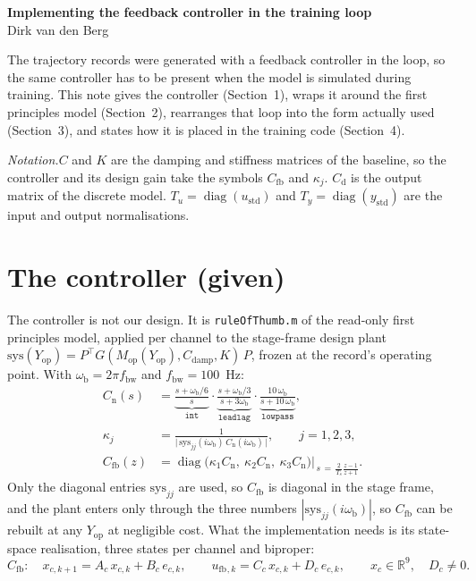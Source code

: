 \documentclass[11pt]{article}
\newcommand{\R}{\mathbb{R}}
\newcommand{\diag}{\operatorname{diag}}
\newcommand{\Cfb}{C_{\mathrm{fb}}}
\newcommand{\Cnorm}{C_{\mathrm{n}}}
\newcommand{\wb}{\omega_{\mathrm{b}}}
\newcommand{\ufb}{u_{\mathrm{fb}}}
\newcommand{\Yop}{Y_{\mathrm{op}}}
\newcommand{\Tu}{T_{u}}
\newcommand{\Ty}{T_{y}}
\begin{document}
\begin{center}
  {\Large\bfseries Implementing the feedback controller in the training loop}\\[0.3em]
  {\normalsize Dirk van den Berg}
\end{center}
\vspace{0.3em}

\noindent The trajectory records were generated with a feedback controller in the loop, so the
same controller has to be present when the model is simulated during training. This note gives
the controller (Section~1), wraps it around the first principles model (Section~2), rearranges
that loop into the form actually used (Section~3), and states how it is placed in the training
code (Section~4).

\medskip\noindent\emph{Notation.}\quad $C$ and $K$ are the damping and stiffness matrices of the
baseline, so the controller and its design gain take the symbols $\Cfb$ and $\kappa_j$.
$C_{\mathrm{d}}$ is the output matrix of the discrete model. $\Tu = \diag(u_{\mathrm{std}})$ and
$\Ty = \diag(y_{\mathrm{std}})$ are the input and output normalisations.

\section{The controller (given)}

The controller is not our design. It is \texttt{ruleOfThumb.m} of the read-only first principles
model, applied per channel to the stage-frame design plant
$\mathrm{sys}(\Yop) = P^{\top} G(M_{\mathrm{op}}(\Yop), C_{\mathrm{damp}}, K)\, P$, frozen at the
record's operating point. With $\wb = 2\pi f_{\mathrm{bw}}$ and $f_{\mathrm{bw}} = 100$~Hz:
\begin{align}
  \Cnorm(s) &=
  \underbrace{\frac{s + \wb/6}{s}}_{\texttt{int}} \cdot
  \underbrace{\frac{s + \wb/3}{s + 3\wb}}_{\texttt{leadlag}} \cdot
  \underbrace{\frac{10\,\wb}{s + 10\,\wb}}_{\texttt{lowpass}} ,
  \label{eq:cnorm}\\[1mm]
  \kappa_j &= \frac{1}{\bigl|\,\mathrm{sys}_{jj}(i\wb)\,\Cnorm(i\wb)\,\bigr|} ,
  \qquad j = 1,2,3 ,
  \label{eq:kappa}\\[1mm]
  \Cfb(z) &= \diag\bigl(\kappa_1\Cnorm,\ \kappa_2\Cnorm,\ \kappa_3\Cnorm\bigr)
  \Bigr|_{\,s \,=\, \frac{2}{T_s}\frac{z-1}{z+1}} .
  \label{eq:cfb}
\end{align}
Only the diagonal entries $\mathrm{sys}_{jj}$ are used, so $\Cfb$ is diagonal in the stage frame,
and the plant enters only through the three numbers $|\mathrm{sys}_{jj}(i\wb)|$, so $\Cfb$ can be
rebuilt at any $\Yop$ at negligible cost. What the implementation needs is its state-space
realisation, three states per channel and biproper:
\begin{equation}
  \Cfb : \quad
  x_{c,k+1} = A_c\,x_{c,k} + B_c\,e_{c,k} ,
  \qquad
  \ufb{}_{,k} = C_c\,x_{c,k} + D_c\,e_{c,k} ,
  \qquad
  x_c \in \R^{9} ,\quad D_c \neq 0 .
  \label{eq:cfbss}
\end{equation}
\end{document}
